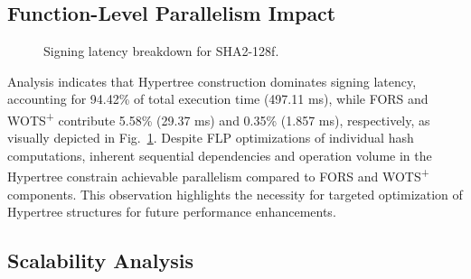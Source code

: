 \documentclass[journal]{IEEEtran}
\begin{document}
\color{black}

\subsection{Function-Level Parallelism Impact}

\begin{figure}[h]
  \centering
  \caption{Signing latency breakdown for SHA2-128f.}
  \label{fig:flp_pie}
\end{figure}

Analysis indicates that Hypertree construction dominates signing latency, accounting for 94.42\% of total execution time (497.11 ms), while FORS and WOTS\textsuperscript{+} contribute 5.58\% (29.37 ms) and 0.35\% (1.857 ms), respectively, as visually depicted in Fig.~\ref{fig:flp_pie}. Despite FLP optimizations of individual hash computations, inherent sequential dependencies and operation volume in the Hypertree constrain achievable parallelism compared to FORS and WOTS\textsuperscript{+} components. This observation highlights the necessity for targeted optimization of Hypertree structures for future performance enhancements.

\subsection{Scalability Analysis}
\end{document}
